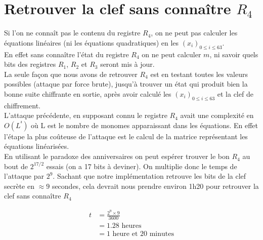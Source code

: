 \section{Retrouver la clef sans connaître $R_4$}

Si l'on ne connaît pas le contenu du registre $R_4$, on ne peut pas calculer
les équations linéaires (ni les équations quadratiques) en les $(x_i)_{0\leq i \leq 63}$. \\

En effet sans connaître l'état du registre $R_4$ on ne peut calculer $m$,
ni savoir quels bits des registres $R_1$, $R_2$ et $R_3$ seront mis à jour.\\

La seule façon que nous avons de retrouver $R_4$ est en testant toutes les valeurs possibles (attaque par force brute),
 jusqu'à trouver un état qui produit bien la bonne suite chiffrante en sortie, après avoir calculé
les $(x_i)_{0\leq i \leq 63}$ et la clef de chiffrement.\\

L'attaque précédente, en supposant connu le registre $R_4$ avait une complexité en $O(L^²)$
où L est le nombre de monomes apparaissant dans les équations. En effet l'étape la plus coûteuse
de l'attaque est le calcul de la matrice représentant les équations linéarisées.\\

En utilisant le paradoxe des anniversaires on peut espérer trouver le bon $R_4$ au bout de
$2^{17/2}$ essais (on a 17 bits à deviner).
On multiplie donc le temps de l'attaque par $2^{9}$. Sachant que notre implémentation retrouve les bits de la clef
secrète en $\approx 9$ secondes, cela devrait nous prendre environ 1h20 pour retrouver la clef sans connaître $R_4$

\begin{align*}
t & = \frac{2^9 \times 9}{3600}\\ 
& = 1.28 \mbox{ heures}\\
& = 1 \mbox{ heure et }20\mbox{ minutes}\\
\end{align*}

